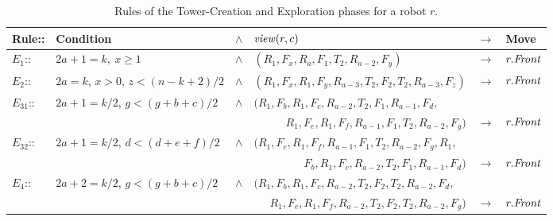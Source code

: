 \begin{landscape}
\begin{table}
\begin{tabular}{|l l c  l c l|}
Rule:: & Condition & $\land$ & \multicolumn{1}{l}{$\mathit{view}(r, c)$}&$\rightarrow$&Move\\
\hline
$E_1$:: &{$2a+1=k, \ x \geq 1$}&$\land$&
\multicolumn{1}{l}{${   (R_1, F_x, R_a, F_1, T_2, R_{a-2}, F_y)}$}&
$\rightarrow$& $r.\textit{Front}$\\
$E_2$:: &{$2a = k$, $x > 0$,  $z < (n-k+2)/2$ }&$\land$&
\multicolumn{1}{l}{${ 
(R_1, F_x, R_1, F_y, R_{a-3}, T_2, F_2, T_2, R_{a-3}, F_z)}$}&
$\rightarrow$& $r.\textit{Front}$\\
$E_{31}$:: &$2a+1 = k/2 $, $g< (g+b+c)/2$&$\land$&
\multicolumn{1}{l}{${   
(R_1, F_b, R_1, F_c, R_{a-2}, T_2, F_1, R_{a-1}, F_d, }$}&&\\
		&&&\multicolumn{1}{r}{
${  R_1, F_e, R_1, F_f, R_{a-1}, F_1, T_2, R_{a-2}, F_g)}$}&
$\rightarrow$&$r.\textit{Front}$\\

$E_{32}$:: &$2a+1 = k/2 $, $d < (d+e+f)/2$&$\land$&
\multicolumn{1}{l}{${   
(R_1, F_e, R_1, F_f, R_{a-1}, F_1, T_2, R_{a-2}, F_g, R_1, }$}&&\\
                 &&&\multicolumn{1}{r}{
${ F_b, R_1, F_c, R_{a-2}, T_2,  F_1, R_{a-1}, F_d)}$}&
$\rightarrow$&$r.\textit{Front}$\\
$E_{4}$:: 	&{$2a+2 = k/2 $,  $g< (g+b+c)/2$}&$\land$&
\multicolumn{1}{l}{${   
(R_1, F_{b}, R_1, F_{c}, R_{a-2}, T_2, F_2, T_2, R_{a-2}, F_d, }$}&&\\
		&&&\multicolumn{1}{r}{
${  R_1, F_{e}, R_1, F_f, R_{a-2}, T_2, F_2, T_2, R_{a-2}, F_{g})}$}&
$\rightarrow$&$r.\textit{Front}$\\
\hline
\end{tabular}
\caption{Rules of the Tower-Creation and Exploration phases  for a robot $r$.}
\label{tab: rules}
\end{table}
\end{landscape}

